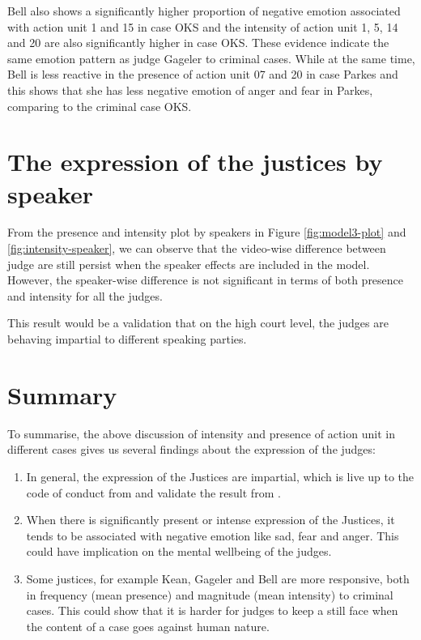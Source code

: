 \documentclass{monashthesis}
\begin{document}
Bell also shows a significantly higher proportion of negative emotion associated with action unit 1 and 15 in case OKS and the intensity of action unit 1, 5, 14 and 20 are also significantly higher in case OKS. These evidence indicate the same emotion pattern as judge Gageler to criminal cases. While at the same time, Bell is less reactive in the presence of action unit 07 and 20 in case Parkes and this shows that she has less negative emotion of anger and fear in Parkes, comparing to the criminal case OKS.

\hypertarget{the-expression-of-the-justices-by-speaker}{%
\section{The expression of the justices by speaker}\label{the-expression-of-the-justices-by-speaker}}

From the presence and intensity plot by speakers in Figure \ref{fig:model3-plot} and \ref{fig:intensity-speaker}, we can observe that the video-wise difference between judge are still persist when the speaker effects are included in the model. However, the speaker-wise difference is not significant in terms of both presence and intensity for all the judges.

This result would be a validation that on the high court level, the judges are behaving impartial to different speaking parties.

\hypertarget{summary}{%
\section{Summary}\label{summary}}

To summarise, the above discussion of intensity and presence of action unit in different cases gives us several findings about the expression of the judges:

\begin{enumerate}
\def\labelenumi{\arabic{enumi})}
\item
  In general, the expression of the Justices are impartial, which is live up to the code of conduct from \textcite{judicalguid} and validate the result from \textcite{tutton2018judicial}.
\item
  When there is significantly present or intense expression of the Justices, it tends to be associated with negative emotion like sad, fear and anger. This could have implication on the mental wellbeing of the judges.
\item
  Some justices, for example Kean, Gageler and Bell are more responsive, both in frequency (mean presence) and magnitude (mean intensity) to criminal cases. This could show that it is harder for judges to keep a still face when the content of a case goes against human nature.
\end{enumerate}
\end{document}
